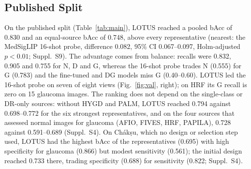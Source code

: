 \documentclass[runningheads]{llncs}
\newcommand{\sups}[1]{Suppl.~S#1}
\begin{document}
\subsection{Published Split}\label{sec:pub}
\begin{table}[tb]
\caption{Published split, means over three seeds; raw scores unless marked TS. Representatives are chosen by validation; LOTUS and the initial design are not untouched estimates (Sec.~\ref{sec:lotus}); their Val is the validation split of the development sources. Image-level intervals in the text are conditional on these seven sources. $^\dagger$FLAIR's pretraining includes five FundusShift sources (FIVES, HRF, PAPILA, Paraguay, Ch\'ak\d{s}u); reference only.}\label{tab:main}
\centering\scriptsize\setlength{\tabcolsep}{1.75pt}
\end{table}

On the published split (Table~\ref{tab:main}), LOTUS reached a pooled bAcc of 0.830 and an equal-source bAcc of 0.748, above every representative (nearest: the MedSigLIP 16-shot probe, difference 0.082, 95\% CI 0.067--0.097, Holm-adjusted $p<0.01$; \sups{9}). The advantage comes from balance: recalls were 0.832, 0.905 and 0.755 for N, D and G, whereas the 16-shot probe trades N (0.555) for G (0.783) and the fine-tuned and DG models miss G (0.40--0.60). LOTUS led the 16-shot probe on seven of eight views (Fig.~\ref{fig:val}, right); on HRF its G recall is zero on 15 glaucoma images. The ranking does not depend on the single-class or DR-only sources: without HYGD and PALM, LOTUS reached 0.794 against 0.698--0.772 for the six strongest representatives, and on the four sources that assessed normal images for glaucoma (AFIO, FIVES, HRF, PAPILA), 0.728 against 0.591--0.689 (\sups{4}). On Ch\'ak\d{s}u, which no design or selection step used, LOTUS had the highest bAcc of the representatives (0.695) with high specificity for glaucoma (0.866) but modest sensitivity (0.561); the initial design reached 0.733 there, trading specificity (0.688) for sensitivity (0.822; \sups{4}).
\end{document}
